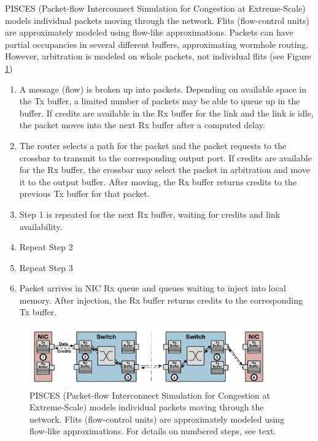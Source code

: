 PISCES (Packet-flow Interconnect Simulation for Congestion at Extreme-Scale) models individual packets moving through the network. Flits (flow-control units) are approximately modeled using flow-like approximations. Packets can have partial occupancies in several different buffers, approximating wormhole routing. However, arbitration is modeled on whole packets, not individual flits (see Figure \ref{fig:piscesOverview})
\begin{enumerate}
\item A message (flow) is broken up into packets. Depending on available space in the Tx buffer, a limited number of packets may be able to queue up in the buffer. If credits are available in the Rx buffer for the link and the link is idle, the packet moves into the next Rx buffer after a computed delay.
\item The router selects a path for the packet and the packet requests to the crossbar to transmit to the corresponding output port. If credits are available for the Rx buffer, the crossbar may select the packet in arbitration and move it to the output buffer. After moving, the Rx buffer returns credits to the previous Tx buffer for that packet.
\item Step 1 is repeated for the next Rx buffer, waiting for credits and link availability.
\item Repeat Step 2
\item Repeat Step 3
\item Packet arrives in NIC Rx queue and queues waiting to inject into local memory. After injection, the Rx buffer returns credits to the corresponding Tx buffer.
\end{enumerate}

\begin{figure}[h!]
\centering
\includegraphics[width=0.9\textwidth]{figures/pisces_overview.pdf}
\caption[PISCES model]{PISCES (Packet-flow Interconnect Simulation for Congestion at Extreme-Scale) models individual packets moving through the network. Flits (flow-control units) are approximately modeled using flow-like approximations. For details on numbered steps, see text.}
\label{fig:piscesOverview}
\end{figure}



